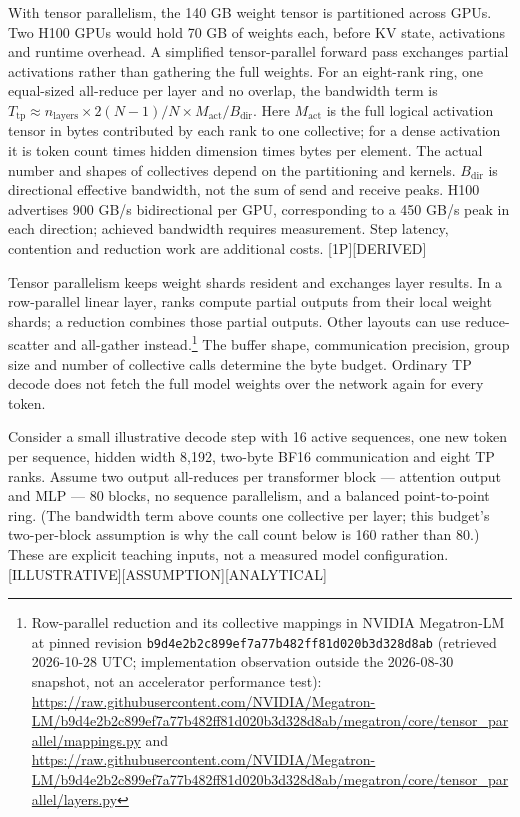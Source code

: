 With tensor parallelism, the 140 GB weight tensor is partitioned across
GPUs. Two H100 GPUs would hold 70 GB of weights each, before KV state,
activations and runtime overhead. A simplified tensor-parallel forward
pass exchanges partial activations rather than gathering the full
weights. For an eight-rank ring, one equal-sized all-reduce per layer
and no overlap, the bandwidth term is
\(T_\text{tp} \approx n_\text{layers} \times 2(N-1)/N \times M_\text{act}/B_\text{dir}\).
Here \(M_\text{act}\) is the full logical activation tensor in bytes
contributed by each rank to one collective; for a dense activation it is
token count times hidden dimension times bytes per element. The actual
number and shapes of collectives depend on the partitioning and kernels.
\(B_\text{dir}\) is directional effective bandwidth, not the sum of send
and receive peaks. H100 advertises 900 GB/s bidirectional per GPU,
corresponding to a 450 GB/s peak in each direction; achieved bandwidth
requires measurement. Step latency, contention and reduction work are
additional costs. \mbox{{[}1P{]}}\hspace{0pt}\mbox{{[}DERIVED{]}}

Tensor parallelism keeps weight shards resident and exchanges layer
results. In a row-parallel linear layer, ranks compute partial outputs
from their local weight shards; a reduction combines those partial
outputs. Other layouts can use reduce-scatter and all-gather
instead.\footnote{Row-parallel reduction and its collective mappings in
  NVIDIA Megatron-LM at pinned revision
  \texttt{b9d4e2b2c899ef7a77b482ff81d020b3d328d8ab} (retrieved
  2026-10-28 UTC; implementation observation outside the 2026-08-30
  snapshot, not an accelerator performance test):
  \url{https://raw.githubusercontent.com/NVIDIA/Megatron-LM/b9d4e2b2c899ef7a77b482ff81d020b3d328d8ab/megatron/core/tensor_parallel/mappings.py}
  and
  \url{https://raw.githubusercontent.com/NVIDIA/Megatron-LM/b9d4e2b2c899ef7a77b482ff81d020b3d328d8ab/megatron/core/tensor_parallel/layers.py}}
The buffer shape, communication precision, group size and number of
collective calls determine the byte budget. Ordinary TP decode does not
fetch the full model weights over the network again for every token.

Consider a small illustrative decode step with 16 active sequences, one
new token per sequence, hidden width 8,192, two-byte BF16 communication
and eight TP ranks. Assume two output all-reduces per transformer block
--- attention output and MLP --- 80 blocks, no sequence parallelism, and
a balanced point-to-point ring. (The bandwidth term above counts one
collective per layer; this budget's two-per-block assumption is why the
call count below is 160 rather than 80.) These are explicit teaching
inputs, not a measured model configuration.
\mbox{{[}ILLUSTRATIVE{]}}\hspace{0pt}\mbox{{[}ASSUMPTION{]}}\hspace{0pt}\mbox{{[}ANALYTICAL{]}}

